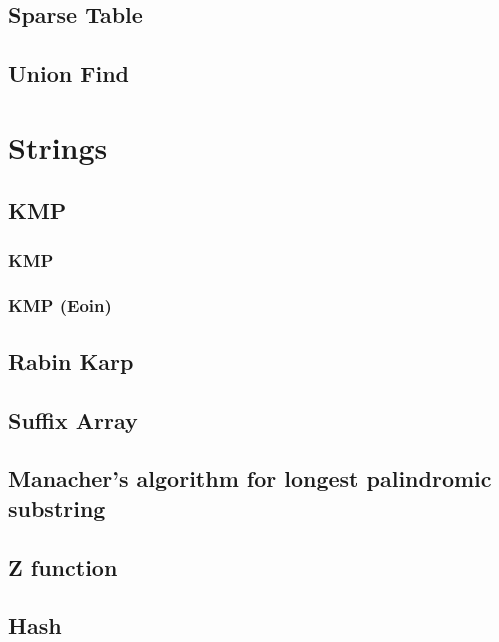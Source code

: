 \documentclass[twocolumn, landscape]{report}
\begin{document}
        \section{Sparse Table}
        
        \section{Union Find}
        

    \chapter*{Strings}
        \section{KMP}
            \subsection{KMP}
            
            \subsection{KMP (Eoin)}
            
        \section{Rabin Karp}
        
        \section{Suffix Array}
        
        \section[Manacher's Algorithm]{Manacher's algorithm for longest palindromic substring}
        
        \section{Z function}
        
        \section{Hash}
        
\end{document}
